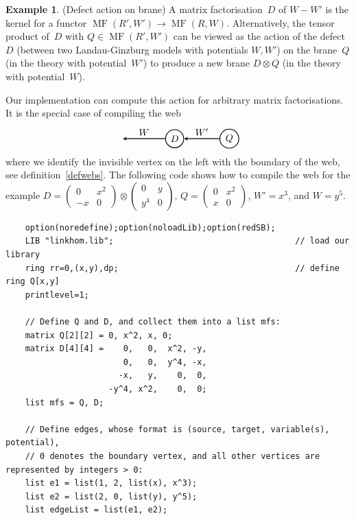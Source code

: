 \documentclass{compositio}
\theoremstyle{definition}
\newtheorem{example}[theorem]{Example}
\numberwithin{equation}{section}
\DeclareMathOperator{\MF}{MF}
\begin{document}
\begin{example}(Defect action on brane) 
A matrix factorisation~$D$ of $W-W'$ is the kernel for a functor $\MF(R',W')\longrightarrow \MF(R,W)$. Alternatively, the tensor product of~$D$ with $Q\in \MF(R',W')$ can be viewed as the action of the defect~$D$ (between two Landau-Ginzburg models with potentials $W,W'$) on the brane~$Q$ (in the theory with potential~$W'$) to produce a new brane $D\otimes Q$ (in the theory with potential~$W$). 

Our implementation can compute this action for arbitrary matrix factorisations. It is the special case of compiling the web
$$
\begin{tikzpicture}[scale=1.0,baseline=-0.1cm, inner sep=1mm, >=stealth]
\node (b) at (-2,0)  {};
\node (D) at (0,0) [circle,draw=black,fill= white, thick] {$D$};
\node (Q) at (2,0) [circle,draw=black,fill= white, thick] {$Q$};
\draw[->,  thick] (Q) -- (D) node[midway,above] {$W'$}; 
\draw[->,  thick] (D) -- (b) node[midway,above] {$W$}; 
\end{tikzpicture} 
$$
where we identify the invisible vertex on the left with the boundary of the web, see definition~\ref{defwebs}. The following code shows how to compile the web for the example $D=(\begin{smallmatrix} 0& x^2 \\ -x & 0\end{smallmatrix}) \otimes (\begin{smallmatrix} 0& y \\ y^4 & 0\end{smallmatrix})$, $Q=(\begin{smallmatrix} 0& x^2 \\ x & 0\end{smallmatrix})$, $W'=x^3$, and $W=y^5$.
{\footnotesize
\begin{verbatim}
    option(noredefine);option(noloadLib);option(redSB);
    LIB "linkhom.lib";                                     // load our library
    ring rr=0,(x,y),dp;                                    // define ring Q[x,y]
    printlevel=1;

    // Define Q and D, and collect them into a list mfs:
    matrix Q[2][2] = 0, x^2, x, 0;
    matrix D[4][4] =    0,   0,  x^2, -y,
                        0,   0,  y^4, -x,
                       -x,   y,    0,  0,
                     -y^4, x^2,    0,  0;
    list mfs = Q, D;
    
    // Define edges, whose format is (source, target, variable(s), potential), 
    // 0 denotes the boundary vertex, and all other vertices are represented by integers > 0:
    list e1 = list(1, 2, list(x), x^3);
    list e2 = list(2, 0, list(y), y^5);
    list edgeList = list(e1, e2);
    

\end{verbatim}}
\end{example}
\end{document}

